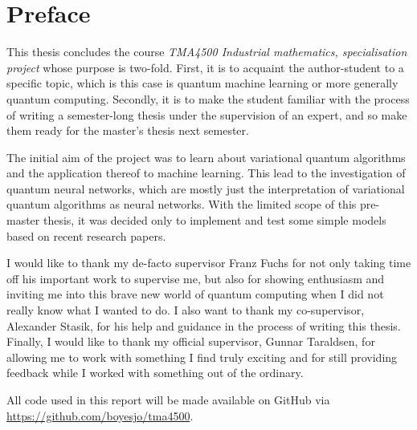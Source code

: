 \section*{Preface}
This thesis concludes the course \textit{TMA4500 Industrial mathematics, specialisation project} whose purpose is two-fold.
First, it is to acquaint the author-student to a specific topic, which is this case is quantum machine learning or more generally quantum computing.
Secondly, it is to make the student familiar with the process of writing a semester-long thesis under the supervision of an expert, and so make them ready for the master's thesis next semester.

The initial aim of the project was to learn about variational quantum algorithms and the application thereof to machine learning.
This lead to the investigation of quantum neural networks, which are mostly just the interpretation of variational quantum algorithms as neural networks.
With the limited scope of this pre-master thesis, it was decided only to implement and test some simple models based on recent research papers.

I would like to thank my de-facto supervisor Franz Fuchs for not only taking time off his important work to supervise me, but also for showing enthusiasm and inviting me into this brave new world of quantum computing when I did not really know what I wanted to do.
I also want to thank my co-supervisor, Alexander Stasik, for his help and guidance in the process of writing this thesis.
Finally, I would like to thank my official supervisor, Gunnar Taraldsen, for allowing me to work with something I find truly exciting and for still providing feedback while I worked with something out of the ordinary.

All code used in this report will be made available on GitHub via \url{https://github.com/boyesjo/tma4500}.



\cleardoublepage